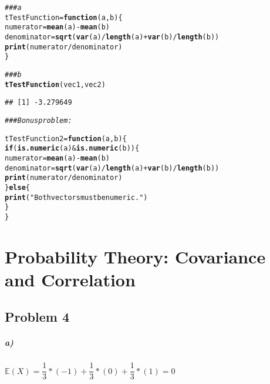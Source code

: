 \documentclass[12pt,letter]{article}\usepackage[]{graphicx}\usepackage[]{color}
\makeatletter
\newcommand{\hlstr}[1]{\textcolor[rgb]{0.192,0.494,0.8}{#1}}%
\newcommand{\hlcom}[1]{\textcolor[rgb]{0.678,0.584,0.686}{\textit{#1}}}%
\newcommand{\hlopt}[1]{\textcolor[rgb]{0,0,0}{#1}}%
\newcommand{\hlstd}[1]{\textcolor[rgb]{0.345,0.345,0.345}{#1}}%
\newcommand{\hlkwa}[1]{\textcolor[rgb]{0.161,0.373,0.58}{\textbf{#1}}}%
\newcommand{\hlkwb}[1]{\textcolor[rgb]{0.69,0.353,0.396}{#1}}%
\newcommand{\hlkwc}[1]{\textcolor[rgb]{0.333,0.667,0.333}{#1}}%
\newcommand{\hlkwd}[1]{\textcolor[rgb]{0.737,0.353,0.396}{\textbf{#1}}}%
\newenvironment{kframe}{%
 \def\at@end@of@kframe{}%
 \ifinner\ifhmode%
  \def\at@end@of@kframe{\end{minipage}}%
  \begin{minipage}{\columnwidth}%
 \fi\fi%
 \def\FrameCommand##1{\hskip\@totalleftmargin \hskip-\fboxsep
 \colorbox{shadecolor}{##1}\hskip-\fboxsep
     \hskip-\linewidth \hskip-\@totalleftmargin \hskip\columnwidth}%
 \MakeFramed {\advance\hsize-\width
   \@totalleftmargin\z@ \linewidth\hsize
   \@setminipage}}%
 {\par\unskip\endMakeFramed%
 \at@end@of@kframe}
\newenvironment{knitrout}{}{} %
\makeatother
\begin{document}
\begin{knitrout}
\color{fgcolor}\begin{kframe}
\begin{alltt}
\hlcom{### a}
\hlstd{tTestFunction} \hlkwb{=} \hlkwa{function}\hlstd{(}\hlkwc{a}\hlstd{,} \hlkwc{b}\hlstd{) \{}
    \hlstd{numerator} \hlkwb{=} \hlkwd{mean}\hlstd{(a)} \hlopt{-} \hlkwd{mean}\hlstd{(b)}
    \hlstd{denominator} \hlkwb{=} \hlkwd{sqrt}\hlstd{(}\hlkwd{var}\hlstd{(a)}\hlopt{/}\hlkwd{length}\hlstd{(a)} \hlopt{+} \hlkwd{var}\hlstd{(b)}\hlopt{/}\hlkwd{length}\hlstd{(b))}
    \hlkwd{print}\hlstd{(numerator}\hlopt{/}\hlstd{denominator)}
\hlstd{\}}

\hlcom{### b}
\hlkwd{tTestFunction}\hlstd{(vec1, vec2)}
\end{alltt}
\begin{verbatim}
## [1] -3.279649
\end{verbatim}
\begin{alltt}
\hlcom{### Bonus problem:}

\hlstd{tTestFunction2} \hlkwb{=} \hlkwa{function}\hlstd{(}\hlkwc{a}\hlstd{,} \hlkwc{b}\hlstd{) \{}
    \hlkwa{if} \hlstd{(}\hlkwd{is.numeric}\hlstd{(a)} \hlopt{&} \hlkwd{is.numeric}\hlstd{(b)) \{}
        \hlstd{numerator} \hlkwb{=} \hlkwd{mean}\hlstd{(a)} \hlopt{-} \hlkwd{mean}\hlstd{(b)}
        \hlstd{denominator} \hlkwb{=} \hlkwd{sqrt}\hlstd{(}\hlkwd{var}\hlstd{(a)}\hlopt{/}\hlkwd{length}\hlstd{(a)} \hlopt{+} \hlkwd{var}\hlstd{(b)}\hlopt{/}\hlkwd{length}\hlstd{(b))}
        \hlkwd{print}\hlstd{(numerator}\hlopt{/}\hlstd{denominator)}
    \hlstd{\}} \hlkwa{else} \hlstd{\{}
        \hlkwd{print}\hlstd{(}\hlstr{"Both vectors must be numeric."}\hlstd{)}
    \hlstd{\}}
\hlstd{\}}
\end{alltt}
\end{kframe}
\end{knitrout}



\section*{Probability Theory: Covariance and Correlation}

\subsection*{Problem 4}

\subparagraph{a)} $\mathbb{E}(X) = \dfrac{1}{3}*(-1) + \dfrac{1}{3}*(0) + \dfrac{1}{3}*(1) = 0$
\end{document}
